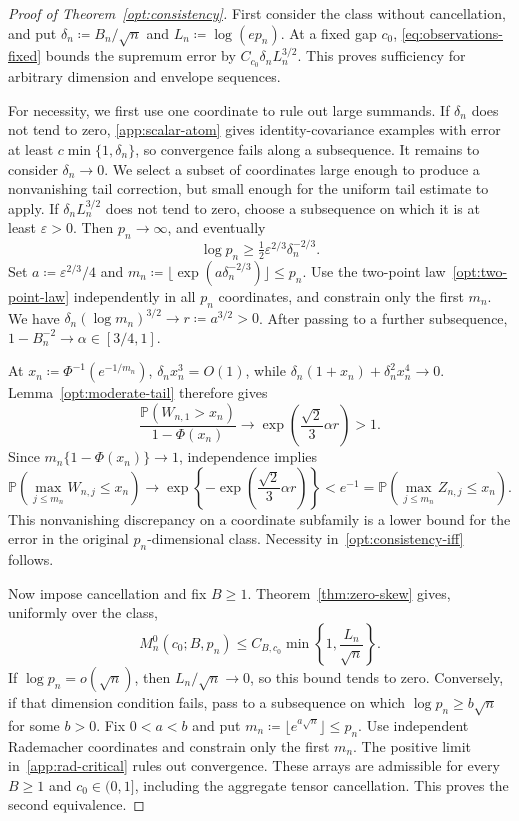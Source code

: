 \documentclass[11pt,letterpaper]{article}
\theoremstyle{remark}
\newcommand{\Pp}{\mathbb P}
\begin{document}
\begin{proof}[Proof of Theorem~\ref{opt:consistency}]
First consider the class without cancellation, and put
\(\delta_n\coloneqq B_n/\sqrt n\) and
\(L_n\coloneqq\log(ep_n)\). At a fixed gap \(c_0\), \eqref{eq:observations-fixed} bounds the
supremum error by \(C_{c_0}\delta_nL_n^{3/2}\). This proves sufficiency
for arbitrary dimension and envelope sequences.

For necessity, we first use one coordinate to rule out large
summands. If \(\delta_n\) does not tend to zero,
\eqref{app:scalar-atom} gives identity-covariance examples with error
at least \(c\min\{1,\delta_n\}\), so convergence fails along a
subsequence. It remains to consider \(\delta_n\to0\). We select a subset of
coordinates large enough to produce a nonvanishing tail correction,
but small enough for the uniform tail estimate to apply.
If \(\delta_nL_n^{3/2}\) does not tend to zero, choose a subsequence
on which it is at least \(\varepsilon>0\). Then \(p_n\to\infty\), and
eventually
\[
 \log p_n\ge\tfrac12\varepsilon^{2/3}\delta_n^{-2/3}.
\]
Set \(a\coloneqq\varepsilon^{2/3}/4\) and
\(m_n\coloneqq\lfloor\exp(a\delta_n^{-2/3})\rfloor\le p_n\).
Use the two-point law~\eqref{opt:two-point-law} independently in all
\(p_n\) coordinates, and constrain only the first \(m_n\).
We have
\(\delta_n(\log m_n)^{3/2}\to r\coloneqq a^{3/2}>0\).
After passing to a further subsequence,
\(1-B_n^{-2}\to\alpha\in[3/4,1]\).

At \(x_n\coloneqq\Phi^{-1}(e^{-1/m_n})\),
\(\delta_nx_n^3=O(1)\), while
\(\delta_n(1+x_n)+\delta_n^2x_n^4\to0\).
Lemma~\ref{opt:moderate-tail} therefore gives
\[
 \frac{\Pp(W_{n,1}>x_n)}{1-\Phi(x_n)}
 \longrightarrow \exp\!\left(\frac{\sqrt2}{3}\alpha r\right)>1.
\]
Since \(m_n\{1-\Phi(x_n)\}\to1\), independence implies
\[
 \Pp(\max_{j\le m_n}W_{n,j}\le x_n)
 \longrightarrow
 \exp\!\left\{-\exp\!\left(\frac{\sqrt2}{3}\alpha r\right)\right\}
 <e^{-1}
 =\Pp(\max_{j\le m_n}Z_{n,j}\le x_n).
\]
This nonvanishing discrepancy on a coordinate subfamily is a lower
bound for the error in the original \(p_n\)-dimensional class.
Necessity in~\eqref{opt:consistency-iff} follows.

Now impose cancellation and fix \(B\ge1\). Theorem~\ref{thm:zero-skew}
gives, uniformly over the class,
\[
 M_n^0(c_0;B,p_n)\le C_{B,c_0}\min\!\left\{1,
 \frac{L_n}{\sqrt n}\right\}.
\]
If \(\log p_n=o(\sqrt n)\), then \(L_n/\sqrt n\to0\), so this
bound tends to zero. Conversely, if that dimension condition fails,
pass to a subsequence on which \(\log p_n\ge b\sqrt n\) for some
\(b>0\). Fix \(0<a<b\) and put
\(m_n\coloneqq\lfloor e^{a\sqrt n}\rfloor\le p_n\).
Use independent Rademacher coordinates and constrain only the first
\(m_n\). The positive limit in~\eqref{app:rad-critical} rules out
convergence. These arrays are admissible for every \(B\ge1\) and
\(c_0\in(0,1]\), including the aggregate tensor cancellation.
This proves the second equivalence.
\end{proof}
\end{document}
